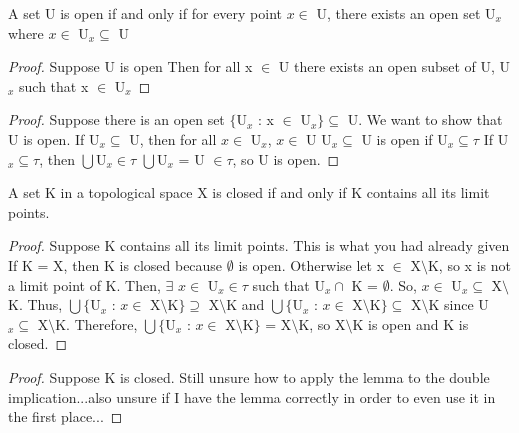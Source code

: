 \documentclass{article}
\begin{document}
	\begin{lemma}
	A set U is open if and only if for every point $x \in$ U, there exists an open set U$_x$ where $x \in $ U$_x \subseteq$ U
	\end{lemma}
	\begin{proof} Suppose U is open
	\newline
		Then for all x $\in$ U there exists an open subset of U, U$_x$ such that x $\in$ U$_x$
	\end{proof}
	\begin{proof} Suppose there is an open set $\lbrace$U$_x$ : x $\in$ U$_x \rbrace \subseteq$ U.
	\newline
	We want to show that U is open.
	\newline
	If U$_x \subseteq$ U, then for all $x \in$ U$_x$, $x \in$ U
	\newline
	U$_x \subseteq$ U is open if U$_x \subseteq \tau$
	\newline
	If U$_x \subseteq \tau$, then $\bigcup$U$_x \in \tau$
	\newline
	$\bigcup$U$_x$ = U $\in \tau$, so U is open.
	\end{proof}
	\begin{proposition}
		A set K in a topological space X is closed if and only if K contains all its limit points.
	\end{proposition}
	\begin{proof} Suppose K contains all its limit points.
	\newline
	This is what you had already given
	\newline
	If K = X, then K is closed because $\emptyset$ is open.
	\newline
	Otherwise let x $\in$ X$\setminus$K, so x is not a limit point of K.
	\newline
	Then, $\exists$ $x \in$ U$_x \in \tau$ such that U$_x \cap$ K = $\emptyset$.
	\newline
	So, $x \in $ U$_x \subseteq$ X$\setminus$K.
	\newline
	Thus, $\bigcup \lbrace$U$_x$ : $x \in$ X$\setminus$K$\rbrace \supseteq$ X$\setminus$K and $\bigcup \lbrace$U$_x$ : $x \in$ X$\setminus$K$\rbrace \subseteq$ X$\setminus$K since U$_x \subseteq$ X$\setminus$K.
	\newline
	Therefore, $\bigcup \lbrace$U$_x$ : $x \in$ X$\setminus$K$\rbrace$ = X$\setminus$K, so X$\setminus$K is open and K is closed.
	\end{proof}
	\begin{proof} Suppose K is closed.
	\newline
		Still unsure how to apply the lemma to the double implication...also unsure if I have the lemma correctly in order to even use it in the first place...
	\end{proof}
\end{document}
